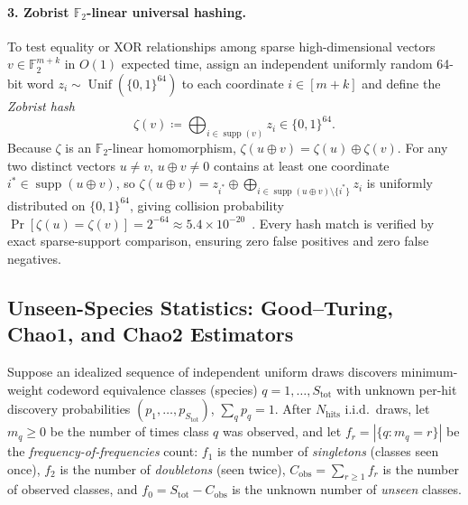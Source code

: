\documentclass[12pt]{article}
\theoremstyle{definition}
\newcommand{\Ftwo}{\mathbb{F}_2}
\DeclareMathOperator{\supp}{supp}
\DeclareMathOperator{\Unif}{Unif}
\begin{document}
\paragraph{3. Zobrist $\Ftwo$-linear universal hashing.}
To test equality or XOR relationships among sparse high-dimensional vectors $v \in \Ftwo^{m+k}$ in $O(1)$ expected
time, assign an independent uniformly random 64-bit word $z_i \sim \Unif(\{0, 1\}^{64})$ to each coordinate $i \in
[m + k]$ and define the \emph{Zobrist hash}~\cite{Zobrist1970,CarterWegman1979}
\begin{equation}\label{eq:zobrist}
  \zeta(v) \coloneqq \bigoplus_{i \in \supp(v)} z_i \in \{0, 1\}^{64}.
\end{equation}
Because $\zeta$ is an $\Ftwo$-linear homomorphism, $\zeta(u \oplus v) = \zeta(u) \oplus \zeta(v)$. For any two
distinct vectors $u \neq v$, $u \oplus v \neq 0$ contains at least one coordinate $i^* \in \supp(u \oplus v)$, so
$\zeta(u \oplus v) = z_{i^*} \oplus \bigoplus_{i \in \supp(u \oplus v) \setminus \{i^*\}} z_i$ is uniformly
distributed on $\{0, 1\}^{64}$, giving collision probability $\Pr[\zeta(u) = \zeta(v)] = 2^{-64} \approx 5.4 \times
10^{-20}$~\cite{CarterWegman1979}. Every hash match is verified by exact sparse-support comparison, ensuring zero
false positives and zero false negatives.

\subsection{Unseen-Species Statistics: Good\texorpdfstring{--}{-}Turing, Chao1, and Chao2
  Estimators}\label{subsec:good_turing}

Suppose an idealized sequence of independent uniform draws discovers minimum-weight codeword equivalence classes
(species) $q = 1, \dots, S_{\mathrm{tot}}$ with unknown per-hit discovery probabilities $(p_1, \dots,
p_{S_{\mathrm{tot}}})$, $\sum_q p_q = 1$. After $N_{\mathrm{hits}}$ i.i.d.\ draws, let $m_q \ge 0$ be the number of
times class $q$ was observed, and let $f_r = |\{q : m_q = r\}|$ be the \emph{frequency-of-frequencies} count: $f_1$
is the number of \emph{singletons} (classes seen once), $f_2$ is the number of \emph{doubletons} (seen twice),
$C_{\mathrm{obs}} = \sum_{r \ge 1} f_r$ is the number of observed classes, and $f_0 = S_{\mathrm{tot}} -
C_{\mathrm{obs}}$ is the unknown number of \emph{unseen} classes.
\end{document}
